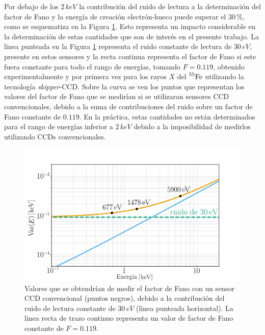 Por debajo de los $2\,\si{keV}$ la contribución del ruido de lectura a la determinación del factor de Fano y la energía de creación electrón-hueco puede superar el $30\,\%$, como se esquematiza en la Figura \ref{fig:Fano_y_ruido}. Esto representa un impacto considerable en la determinación de estas cantidades que son de interés en el presente trabajo. La linea punteada en la Figura \ref{fig:Fano_y_ruido} representa el ruido constante de lectura de $30\,\si{eV}$, presente en estos sensores y la recta continua representa el factor de Fano si este fuera constante para todo el rango de energías, tomando $F=0.119$, obtenido experimentalmente y por primera vez para los rayos $X$ del $\prescript{55}{}{\mbox{Fe}}$ utilizando la tecnología \textit{skipper}-CCD\cite{Rodrigues}. 
Sobre la curva se ven los puntos que representan los valores del factor de Fano que se medirían si se utilizaran sensores CCD convencionales, debido a la suma de contribuciones del ruido sobre un factor de Fano constante de $0.119$. En la práctica, estas cantidades no están determinados para el rango de energías inferior a $2\,\si{keV}$ debido a la imposibilidad de medirlos utilizando CCDs convencionales.
\begin{figure}[h]
    \centering
        \includegraphics[scale=0.5]{Figs/fano_y_ruido.pdf}
    \caption{Valores que se obtendrían de medir el factor de Fano con un sensor CCD convencional (puntos negros), debido a la contribución del ruido de lectura constante de $30\,\si{eV}$ (linea punteada horizontal). La linea recta de trazo continuo representa un valor de factor de Fano constante de $F = 0.119$.}
    \label{fig:Fano_y_ruido}
\end{figure}

